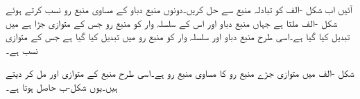 %  

آئیں اب شکل -الف کو تبادلہ منبع سے حل کریں۔دونوں منبع دباو کے مساوی منبع رو نسب کرتے ہوئے شکل -الف ملتا ہے جہاں منبع دباو  اور اس کے سلسلہ وار  کو منبع رو  جس کے متوازی  جڑا ہے میں تبدیل کیا گیا ہے۔اسی طرح منبع دباو  اور سلسلہ وار  کو منبع رو  میں تبدیل کیا گیا ہے جس کے متوازی  نسب ہے۔

شکل -الف میں متوازی جڑے منبع رو کا مساوی منبع رو  ہے۔اسی طرح منبع کے متوازی  اور  مل کر  دیتے ہیں۔یوں شکل-ب حاصل ہوتا ہے۔

